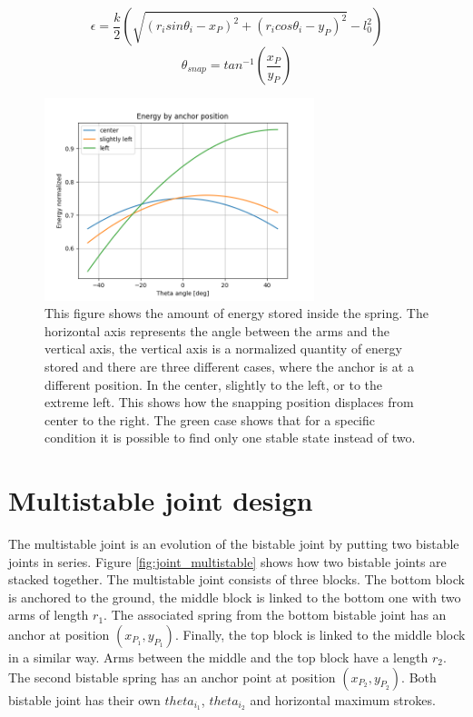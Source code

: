     \begin{equation}
        \epsilon = \frac{k}{2}\left(\sqrt{(r_i sin\theta_i - x_P)^2 + (r_i cos\theta_i - y_P)^2} - l_0^2\right)    
        \label{eq:potential_single}
    \end{equation}
    \begin{equation}
        \theta_{snap} = tan^{-1}\left(\frac{x_P}{y_P}\right)    
        \label{eq:snap_angle}
    \end{equation}
    
    \begin{figure}
        \centering
        \includegraphics[width=0.7\textwidth]{images/energy.png}
        \caption{This figure shows the amount of energy stored inside the spring. The horizontal axis represents the angle between the arms and the vertical axis, the vertical axis is a normalized quantity of energy stored and there are three different cases, where the anchor is at a different position. In the center, slightly to the left, or to the extreme left. This shows how the snapping position displaces from center to the right. The green case shows that for a specific condition it is possible to find only one stable state instead of two. }
        \label{fig:energy}
    \end{figure}
    
    
    
    \section{Multistable joint design}\label{sec:mutistable}
        The multistable joint is an evolution of the bistable joint by putting two bistable joints in series. Figure \ref{fig:joint_multistable} shows how two bistable joints are stacked together. The multistable joint consists of three blocks. The bottom block is anchored to the ground, the middle block is linked to the bottom one with two arms of length $r_1$. The associated spring from the bottom bistable joint has an anchor at position $(x_{P_1}, y_{P_1})$. Finally, the top block is linked to the middle block in a similar way. Arms between the middle and the top block have a length $r_2$. The second bistable spring has an anchor point at position $(x_{P_2}, y_{P_2})$. 
        Both bistable joint has their own $theta_{i_1}$, $theta_{i_2}$ and horizontal maximum strokes.\\
        
